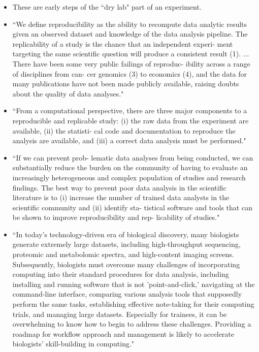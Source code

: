 \documentclass[pdftex,english,11pt,parskip=half]{scrartcl}
\begin{document}
\begin{itemize}
\item These are early steps of the ``dry lab" part of an experiment.
\item ``We define reproducibility as the ability to recompute data analytic results given an observed dataset and knowledge of the data analysis pipeline. The replicability of a study is the chance that an independent experi- ment targeting the same scientific question will produce a consistent result (1). ... There have been some very public failings of reproduc- ibility across a range of disciplines from can- cer genomics (3) to economics (4), and the data for many publications have not been made publicly available, raising doubts about the quality of data analyses." \cite{leek2015opinion}
\item ``From a computational perspective, there are three major components to a reproducible and replicable study: (i) the raw data from the experiment are available, (ii) the statisti- cal code and documentation to reproduce the analysis are available, and (iii) a correct data analysis must be performed." \cite{leek2015opinion}
\item ``If we can prevent prob- lematic data analyses from being conducted, we can substantially reduce the burden on the community of having to evaluate an increasingly heterogeneous and complex population of studies and research findings. The best way to prevent poor data analysis in the scientific literature is to (i) increase the number of trained data analysts in the scientific community and (ii) identify sta- tistical software and tools that can be shown to improve reproducibility and rep- licability of studies." \cite{leek2015opinion}
\item ``In today’s technology-driven era of biological discovery, many biologists generate extremely large datasets, including high-throughput sequencing, proteomic and metabolomic spectra, and high-content imaging screens. Subsequently, biologists must overcome many challenges of incorporating computing into their standard procedures for data analysis, including installing and running software that is not 'point-and-click,' navigating at the command-line interface, comparing various analysis tools that supposedly perform the same tasks, establishing effective note-taking for their computing trials, and managing large datasets. Especially for trainees, it can be overwhelming to know how to begin to address these challenges. Providing a roadmap for workflow approach and management is likely to accelerate biologists’ skill-building in computing." \cite{shade2015computing}

\end{itemize}
\end{document}
